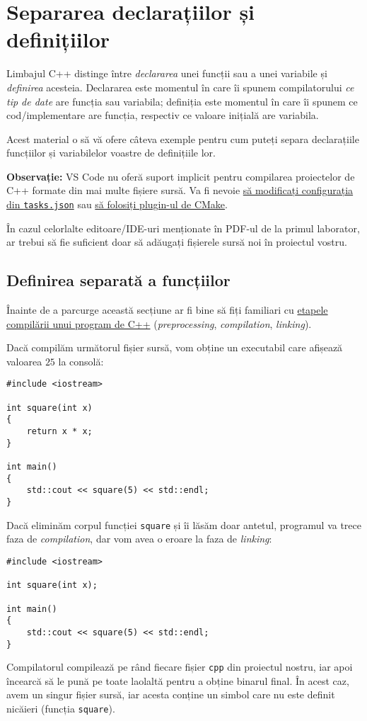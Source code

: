 \section*{Separarea declarațiilor și definițiilor}

Limbajul C++ distinge între \emph{declararea} unei funcții sau a unei variabile și \emph{definirea} acesteia. Declararea este momentul în care îi spunem compilatorului \emph{ce tip de date} are funcția sau variabila; definiția este momentul în care îi spunem ce cod/implementare are funcția, respectiv ce valoare inițială are variabila.

Acest material o să vă ofere câteva exemple pentru cum puteți separa declarațiile funcțiilor și variabilelor voastre de definițiile lor.

\textbf{Observație:} VS Code nu oferă suport implicit pentru compilarea proiectelor de C++ formate din mai multe fișiere sursă. Va fi nevoie \href{https://code.visualstudio.com/docs/cpp/config-msvc#_modifying-tasksjson}{să modificați configurația din \texttt{tasks.json}} sau \href{https://code.visualstudio.com/docs/cpp/cmake-linux}{să folosiți plugin-ul de CMake}.

În cazul celorlalte editoare/IDE-uri menționate în PDF-ul de la primul laborator, ar trebui să fie suficient doar să adăugați fișierele sursă noi în proiectul vostru.

\subsection*{Definirea separată a funcțiilor}

Înainte de a parcurge această secțiune ar fi bine să fiți familiari cu \href{https://stackoverflow.com/a/6264256/5723188}{etapele compilării unui program de C++} (\textit{preprocessing}, \textit{compilation}, \textit{linking}).

Dacă compilăm următorul fișier sursă, vom obține un executabil care afișează valoarea \(25\) la consolă:
\begin{lstlisting}
#include <iostream>

int square(int x)
{
    return x * x;
}

int main()
{
    std::cout << square(5) << std::endl;
}
\end{lstlisting}

Dacă eliminăm corpul funcției \texttt{square} și îi lăsăm doar antetul, programul va trece faza de \emph{compilation}, dar vom avea o eroare la faza de \emph{linking}:
\begin{lstlisting}
#include <iostream>

int square(int x);

int main()
{
    std::cout << square(5) << std::endl;
}
\end{lstlisting}
Compilatorul compilează pe rând fiecare fișier \texttt{cpp} din proiectul nostru, iar apoi încearcă să le pună pe toate laolaltă pentru a obține binarul final. În acest caz, avem un singur fișier sursă, iar acesta conține un simbol care nu este definit nicăieri (funcția \texttt{square}).

